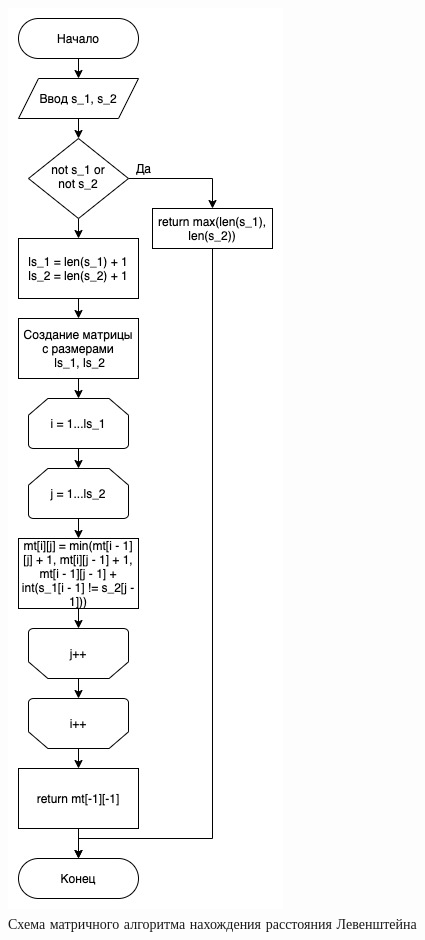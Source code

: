 \documentclass[12pt, a4paper]{report}
\begin{document}
\begin{figure}[h]
\centering
\includegraphics[width=0.44\linewidth]{lm.jpg}
\caption{Схема матричного алгоритма нахождения расстояния Левенштейна}
\label{fig:mpr}
\end{figure}
\end{document}
